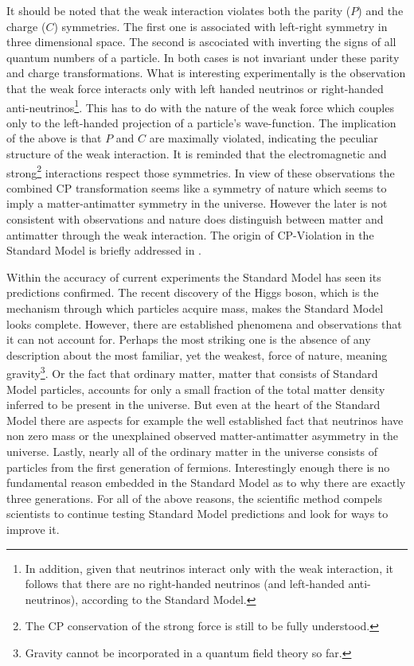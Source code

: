 It should be noted that the weak interaction violates both the parity ($P$) and the charge ($C$) symmetries.
The first one is associated with left-right symmetry in three dimensional space.
The second is ascociated with inverting the signs of all quantum numbers of a particle.
In both cases  is not invariant under these parity and charge transformations. What is interesting experimentally
is the observation\cite{wu-parity,garwin-parity} that the weak force interacts only with left handed neutrinos or right-handed
anti-neutrinos\footnote{In addition, given that neutrinos interact only with the weak interaction, it follows that there are no
right-handed neutrinos (and left-handed anti-neutrinos), according to the Standard Model.}. This has to do with the nature of
the weak force which couples only to the left-handed projection of a particle's
wave-function. The implication of the above is that $P$ and $C$ are maximally violated, indicating the
peculiar structure of the weak interaction. It is reminded that the electromagnetic and
strong\footnote{The CP conservation of the strong force is still to be fully understood.} interactions
respect those symmetries. In view of these observations the combined CP transformation
seems like a symmetry of nature which seems to imply a matter-antimatter symmetry in the universe\cite{Sakharov:1967dj}.
However the later is not consistent with observations and nature does distinguish between matter and antimatter through
the weak interaction. The origin of CP-Violation in the Standard Model is briefly addressed in .

Within the accuracy of current experiments the Standard Model has seen its predictions confirmed.
The recent discovery of the Higgs boson, which is the mechanism through which particles acquire mass, makes the Standard Model looks
complete. However, there are established phenomena and observations that it can not
account for. Perhaps the most striking one is the absence of any description about the most familiar, yet the weakest, force of nature,
meaning gravity\footnote{Gravity cannot be incorporated in a quantum field theory so far.}.
Or the fact that ordinary matter, \ie matter that consists of Standard Model particles, accounts for only a small
fraction of the total matter density inferred to be present in the universe\cite{dmatter-Hinshaw}. But even at the heart
of the Standard Model there are aspects for example the well established fact that neutrinos have non zero
mass\cite{nu-mass-superkam,nu-mass-kamland,nu-mass-sno,nu-mass-daya} or the unexplained observed
matter-antimatter asymmetry in the universe\cite{more-cpv-huet,more-cpv-gavela_I,more-cpv-gavela_II}.
Lastly, nearly all of the ordinary matter in the universe consists of
particles from the first generation of fermions. Interestingly enough there is no fundamental reason embedded in the Standard Model
as to why there are exactly three generations. For all of the above reasons, the scientific method compels scientists to continue
testing Standard Model predictions and look for ways to improve it.
